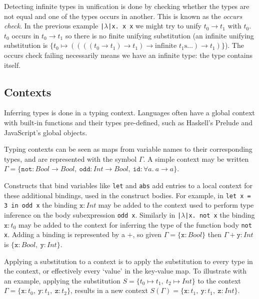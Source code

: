 \documentclass[a4paper,fleqn,oneside,12pt]{report}
\begin{document}
Detecting infinite types in unification is done by checking whether the types are not equal and one of the types occurs in another. This is known as the \textit{occurs check}. In the previous example \texttt{|$\lambda$|x. x x} we might try to unify $t_0 \rightarrow t_1$ with $t_0$. $t_0$ occurs in $t_0 \rightarrow t_1$ so there is no finite unifying substitution (an infinite unifying substitution is $\{ t_0 \mapsto ((((t_0 \rightarrow t_1) \rightarrow t_1) \rightarrow \textrm{infinite }t_1\textrm{s} \dots) \rightarrow t_1) \}$). The occurs check failing necessarily means we have an infinite type: the type contains itself.

\subsection{Contexts}

Inferring types is done in a typing context. Languages often have a global context with built-in functions and their types pre-defined, such as Haskell’s Prelude and JavaScript’s global objects.

Typing contexts can be seen as maps from variable names to their corresponding types, and are represented with the symbol $\Gamma$. A simple context may be written $\Gamma = \{ \mathtt{not} : Bool \rightarrow Bool,\ \mathtt{odd} : Int \rightarrow Bool,\ \mathtt{id} : \forall a.\ a \rightarrow a \}$.

Constructs that bind variables like \texttt{let} and \texttt{abs} add entries to a local context for these additional bindings, used in the construct bodies. For example, in \texttt{let x = 3 in odd x} the binding $\mathtt{x} : Int$ may be added to the context used to perform type inference on the body subexpression \texttt{odd x}. Similarly in \texttt{|$\lambda$|x. not x} the binding $\mathtt{x} : t_0$ may be added to the context for inferring the type of the function body \texttt{not x}. Adding a binding is represented by a $+$, so given $\Gamma = \{ \mathtt{x} : Bool \}$ then $\Gamma + \mathtt{y} : Int$ is $\{ \mathtt{x} : Bool,\ \mathtt{y} : Int \}$.

Applying a substitution to a context is to apply the substitution to every type in the context, or effectively every `value' in the key-value map. To illustrate with an example, applying the substitution $S = \{ t_0 \mapsto t_1,\ t_2 \mapsto Int \}$ to the context $\Gamma = \{ \mathtt{x} : t_0,\ \mathtt{y} : t_1,\ \mathtt{z} : t_2 \}$, results in a new context $S(\Gamma) = \{ \mathtt{x} : t_1,\ \mathtt{y} : t_1,\ \mathtt{z} : Int \}$.
\end{document}
